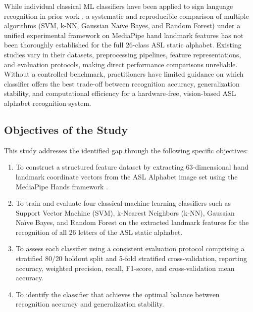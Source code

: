\documentclass[12pt,runningheads]{llncs}
\begin{document}
While individual classical ML classifiers have been applied to sign language recognition in prior work \cite{barczak2011,pugeault2011,hasan2012}, a systematic and reproducible comparison of multiple algorithms (SVM, k-NN, Gaussian Na\"{i}ve Bayes, and Random Forest) under a unified experimental framework on MediaPipe hand landmark features has not been thoroughly established for the full 26-class ASL static alphabet. Existing studies vary in their datasets, preprocessing pipelines, feature representations, and evaluation protocols, making direct performance comparisons unreliable. Without a controlled benchmark, practitioners have limited guidance on which classifier offers the best trade-off between recognition accuracy, generalization stability, and computational efficiency for a hardware-free, vision-based ASL alphabet recognition system.

\subsection{Objectives of the Study}

This study addresses the identified gap through the following specific objectives:

\begin{enumerate}
  \item To construct a structured feature dataset by extracting 63-dimensional hand landmark coordinate vectors from the ASL Alphabet image set using the MediaPipe Hands framework \cite{zhang2020}.

  \item To train and evaluate four classical machine learning classifiers such as Support Vector Machine (SVM), k-Nearest Neighbors (k-NN), Gaussian Na\"{i}ve Bayes, and Random Forest on the extracted landmark features for the recognition of all 26 letters of the ASL static alphabet.

  \item To assess each classifier using a consistent evaluation protocol comprising a stratified 80/20 holdout split and 5-fold stratified cross-validation, reporting accuracy, weighted precision, recall, F1-score, and cross-validation mean accuracy.

  \item To identify the classifier that achieves the optimal balance between recognition accuracy and generalization stability.
\end{enumerate}
\end{document}
